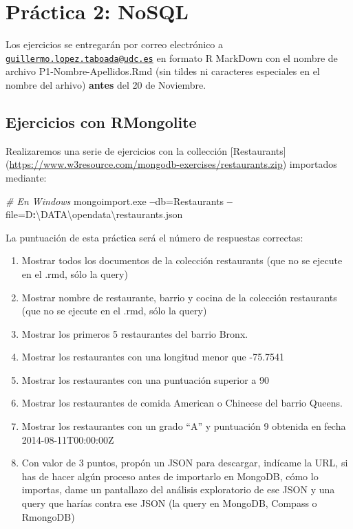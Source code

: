 \documentclass[]{book}
\newenvironment{Shaded}{\begin{snugshade}}{\end{snugshade}}
\newcommand{\CommentTok}[1]{\textcolor[rgb]{0.56,0.35,0.01}{\textit{#1}}}
\newcommand{\OperatorTok}[1]{\textcolor[rgb]{0.81,0.36,0.00}{\textbf{#1}}}
\newcommand{\NormalTok}[1]{#1}
\begin{document}
\section{Práctica 2: NoSQL}\label{practica-2-nosql}

Los ejercicios se entregarán por correo electrónico a
\href{mailto:guillermo.lopez.taboada@udc.es}{\nolinkurl{guillermo.lopez.taboada@udc.es}}
en formato R MarkDown con el nombre de archivo P1-Nombre-Apellidos.Rmd
(sin tildes ni caracteres especiales en el nombre del arhivo)
\textbf{antes} del 20 de Noviembre.

\subsection{Ejercicios con RMongolite}\label{ejercicios-con-rmongolite}

Realizaremos una serie de ejercicios con la collección {[}Restaurants{]}
(\url{https://www.w3resource.com/mongodb-exercises/restaurants.zip})
importados mediante:

\begin{Shaded}
\begin{Highlighting}[]
\CommentTok{# En Windows}
\NormalTok{mongoimport.exe }\OperatorTok{--}\NormalTok{db=Restaurants }\OperatorTok{--}\NormalTok{file=D}\OperatorTok{:}\NormalTok{\textbackslash{}DATA\textbackslash{}opendata\textbackslash{}restaurants.json}
\end{Highlighting}
\end{Shaded}

La puntuación de esta práctica será el número de respuestas correctas:

\begin{enumerate}
\def\labelenumi{\arabic{enumi}.}
\item
  Mostrar todos los documentos de la colección restaurants (que no se
  ejecute en el .rmd, sólo la query)
\item
  Mostrar nombre de restaurante, barrio y cocina de la colección
  restaurants (que no se ejecute en el .rmd, sólo la query)
\item
  Mostrar los primeros 5 restaurantes del barrio Bronx.
\item
  Mostrar los restaurantes con una longitud menor que -75.7541
\item
  Mostrar los restaurantes con una puntuación superior a 90
\item
  Mostrar los restaurantes de comida American o Chineese del barrio
  Queens.
\item
  Mostrar los restaurantes con un grado ``A'' y puntuación 9 obtenida en
  fecha 2014-08-11T00:00:00Z
\item
  Con valor de 3 puntos, propón un JSON para descargar, indícame la URL,
  si has de hacer algún proceso antes de importarlo en MongoDB, cómo lo
  importas, dame un pantallazo del análisis exploratorio de ese JSON y
  una query que harías contra ese JSON (la query en MongoDB, Compass o
  RmongoDB)
\end{enumerate}
\end{document}
